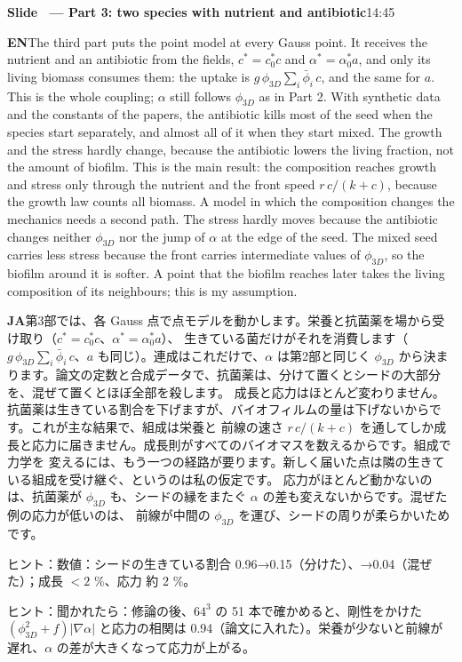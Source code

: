 \documentclass[11pt,a4paper]{article}
\newcounter{sl}
\newcommand{\slide}[2]{\stepcounter{sl}\vspace{8pt}%
  {\color{c3}\large\bfseries Slide \thesl\ --- #1}\hfill{\small #2}\par\vspace{2pt}}
\newcommand{\EN}{\textbf{EN}\quad}
\newcommand{\JA}{\par\textbf{JA}\quad}
\newcommand{\hint}[1]{\par{\color{gray}\small ヒント：#1}}
\begin{document}
\slide{Part 3: two species with nutrient and antibiotic}{14:45}
\EN The third part puts the point model at every Gauss point. It receives the nutrient and an antibiotic from
the fields, $c^*=c^*_0c$ and $\alpha^*=\alpha^*_0a$, and only its living biomass consumes them: the uptake is
$g\,\phi_{3D}\sum_i\bar\phi_i\,c$, and the same for $a$. This is the whole coupling; $\alpha$ still follows
$\phi_{3D}$ as in Part 2. With synthetic data and the constants of the papers, the
antibiotic kills most of the seed when the species start separately, and almost all of it when they start mixed.
The growth and the stress hardly change, because the antibiotic lowers the living fraction, not the
amount of biofilm. This is the main result: the
composition reaches growth and stress only through the nutrient and the front speed $r\,c/(k+c)$, because the
growth law counts all biomass. A model in which the composition changes the mechanics needs a second path.
The stress hardly moves because the antibiotic changes neither $\phi_{3D}$ nor the jump of $\alpha$ at the edge of
the seed. The mixed seed carries less stress because the front carries intermediate values of $\phi_{3D}$, so the
biofilm around it is softer.
A point that the biofilm reaches later takes the living composition of its neighbours; this
is my assumption.
\JA 第3部では、各 Gauss 点で点モデルを動かします。栄養と抗菌薬を場から受け取り（$c^*=c^*_0c$、$\alpha^*=\alpha^*_0a$）、
生きている菌だけがそれを消費します（$g\,\phi_{3D}\sum_i\bar\phi_i\,c$、$a$ も同じ）。連成はこれだけで、$\alpha$ は第2部と同じく $\phi_{3D}$ から決まります。論文の定数と合成データで、抗菌薬は、分けて置くとシードの大部分を、混ぜて置くとほぼ全部を殺します。
成長と応力はほとんど変わりません。抗菌薬は生きている割合を下げますが、バイオフィルムの量は下げないからです。これが主な結果で、組成は栄養と
前線の速さ $r\,c/(k+c)$ を通してしか成長と応力に届きません。成長則がすべてのバイオマスを数えるからです。組成で力学を
変えるには、もう一つの経路が要ります。新しく届いた点は隣の生きている組成を受け継ぐ、というのは私の仮定です。
応力がほとんど動かないのは、抗菌薬が $\phi_{3D}$ も、シードの縁をまたぐ $\alpha$ の差も変えないからです。混ぜた例の応力が低いのは、
前線が中間の $\phi_{3D}$ を運び、シードの周りが柔らかいためです。
\hint{数値：シードの生きている割合 0.96→0.15（分けた）、→0.04（混ぜた）；成長 $<2$ \%、応力 約 2 \%。}
\hint{聞かれたら：修論の後、$64^3$ の 51 本で確かめると、剛性をかけた $(\phi_{3D}^2+f)|\nabla\alpha|$ と応力の相関は 0.94（論文に入れた）。栄養が少ないと前線が遅れ、$\alpha$ の差が大きくなって応力が上がる。}
\end{document}
